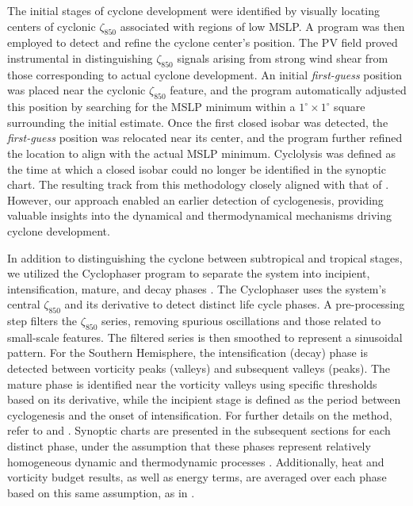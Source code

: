 \documentclass[pdflatex,sn-chicago]{sn-jnl}%
\theoremstyle{plain}
\theoremstyle{definition}
\theoremstyle{remark}
\theoremstyle{definition}
\begin{document}
The initial stages of cyclone development were identified by visually locating centers of cyclonic $\zeta_{850}$ associated with regions of low MSLP. A program was then employed to detect and refine the cyclone center's position. The PV field proved instrumental in distinguishing $\zeta_{850}$ signals arising from strong wind shear from those corresponding to actual cyclone development. An initial \textit{first-guess} position was placed near the cyclonic $\zeta_{850}$ feature, and the program automatically adjusted this position by searching for the MSLP minimum within a $1^{\circ} \times 1^{\circ}$ square surrounding the initial estimate. Once the first closed isobar was detected, the \textit{first-guess} position was relocated near its center, and the program further refined the location to align with the actual MSLP minimum. Cyclolysis was defined as the time at which a closed isobar could no longer be identified in the synoptic chart. The resulting track from this methodology closely aligned with that of \citet{reboita2024assessment}. However, our approach enabled an earlier detection of cyclogenesis, providing valuable insights into the dynamical and thermodynamical mechanisms driving cyclone development.

In addition to distinguishing the cyclone between subtropical and tropical stages, we utilized the Cyclophaser program to separate the system into incipient, intensification, mature, and decay phases \citep{de2025cyclophaser}. The Cyclophaser uses the system's central $\zeta_{850}$ and its derivative to detect distinct life cycle phases. A pre-processing step filters the $\zeta_{850}$ series, removing spurious oscillations and those related to small-scale features. The filtered series is then smoothed to represent a sinusoidal pattern. For the Southern Hemisphere, the intensification (decay) phase is detected between vorticity peaks (valleys) and subsequent valleys (peaks). The mature phase is identified near the vorticity valleys using specific thresholds based on its derivative, while the incipient stage is defined as the period between cyclogenesis and the onset of intensification. For further details on the method, refer to \citet{couto2024new} and \citet{de2025cyclophaser}. Synoptic charts are presented in the subsequent sections for each distinct phase, under the assumption that these phases represent relatively homogeneous dynamic and thermodynamic processes \citep[e.g.,][]{couto2024new}. Additionally, heat and vorticity budget results, as well as energy terms, are averaged over each phase based on this same assumption, as in \citet{dutra2017structure}.
\end{document}
